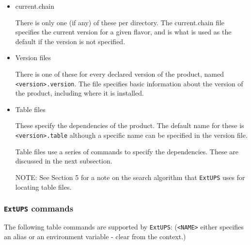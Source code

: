 \documentclass{article}
\newcommand{\code}[1]{\texttt{#1}}
\newcommand{\file}[1]{\texttt{#1}}
\newcommand{\eups}{\code{ExtUPS}}
\begin{document}
\begin{itemize}
  \item current.chain

    There is only one (if any) of these per directory.  The
    current.chain file specifies the current version for a given
    flavor, and is what is used as the default if the version is not
    specified.

  \item Version files

    There is one of these for every declared version of the product,
    named \file{<version>.version}. The file specifies basic information
    about the version of the product, including where it is installed.

  \item Table files

    These specify the dependencies of the product. The default name
    for these is \file{<version>.table} although a specific name can be specified in the
    version file.

    Table files use a series of commands to specify the dependencies. These are
    discussed in the next subsection.

    NOTE: See Section 5 for a note on the search algorithm that \eups{} uses for 
    locating table files.
\end{itemize}

\subsubsection{\eups{} commands}

The following table commands are supported by \eups{}: (\code{<NAME>} either specifies an
alias or an environment variable - clear from the context.)
\end{document}
